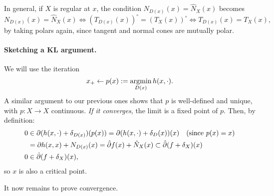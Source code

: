 In general, if $X$ is regular at $x$, the condition $N_{D(x)}(x) =
\hat{N}_X(x)$ becomes
\[
	N_{D(x)}(x) = \hat{N}_X(x) \Leftrightarrow
	\left( T_{D(x)}(x) \right)^{\circ} = \left( T_{X}(x)\right)^{\circ}
	\Leftrightarrow T_{D(x)}(x) = T_X(x),
\]
by taking polars again, since tangent and normal cones are mutually polar.

\paragraph{Sketching a KL argument.} We will use the iteration
\[
	x_+ \gets p(x) := \operatorname*{argmin}_{D(x)} h(x, \cdot).
\]
A similar argument to our previous ones shows that $p$ is well-defined and
unique, with $p: X \to X$ continuous. \textit{If it converges}, the limit is a
fixed point of $p$. Then, by definition:
\begin{align*}
	0 &\in \partial (h(x, \cdot) + \delta_{D(x)})(p(x)) = \partial(h(x, \cdot)
	+ \delta_D(x))(x) \quad (\text{since } p(x) = x) \\
	  &= \partial h(x, x) + N_{D(x)}(x) = \hat{\partial} f(x) + \hat{N}_X(x)
		 \subset \hat{\partial}(f + \delta_X)(x) \\
	0 &\in \hat{\partial} (f + \delta_X)(x),
\end{align*}
so $x$ is also a critical point.

It now remains to prove convergence.
